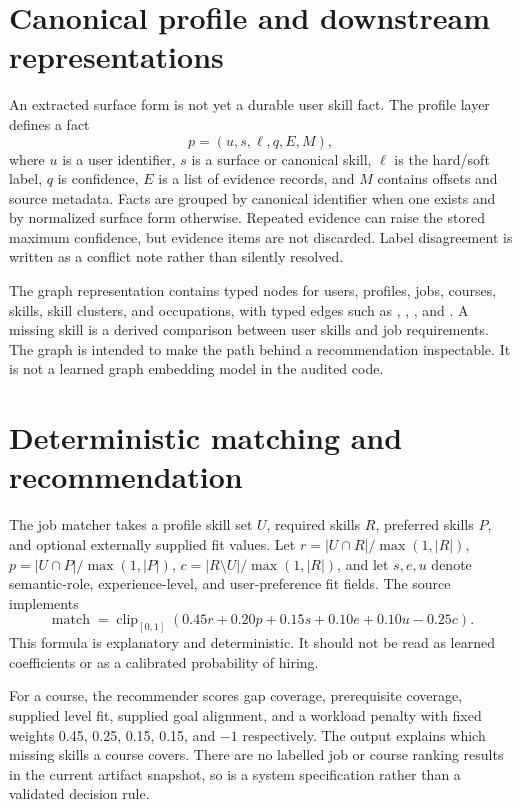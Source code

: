 \section{Canonical profile and downstream representations}

An extracted surface form is not yet a durable user skill fact. The profile layer defines a fact
\begin{equation}
 p=(u, s, \ell, q, E, M),
\end{equation}
where $u$ is a user identifier, $s$ is a surface or canonical skill, $\ell$ is the hard/soft label, $q$ is confidence, $E$ is a list of evidence records, and $M$ contains offsets and source metadata. Facts are grouped by canonical identifier when one exists and by normalized surface form otherwise. Repeated evidence can raise the stored maximum confidence, but evidence items are not discarded. Label disagreement is written as a conflict note rather than silently resolved.

The graph representation contains typed nodes for users, profiles, jobs, courses, skills, skill clusters, and occupations, with typed edges such as , , , and . A missing skill is a derived comparison between user skills and job requirements. The graph is intended to make the path behind a recommendation inspectable. It is not a learned graph embedding model in the audited code.

\section{Deterministic matching and recommendation}

The job matcher takes a profile skill set $U$, required skills $R$, preferred skills $P$, and optional externally supplied fit values. Let $r=|U\cap R|/\max(1,|R|)$, $p=|U\cap P|/\max(1,|P|)$, $c=|R\setminus U|/\max(1,|R|)$, and let $s,e,u$ denote semantic-role, experience-level, and user-preference fit fields. The source implements
\begin{equation}
 \operatorname{match}=\operatorname{clip}_{[0,1]}(0.45r+0.20p+0.15s+0.10e+0.10u-0.25c).
\label{eq:match}
\end{equation}
This formula is explanatory and deterministic. It should not be read as learned coefficients or as a calibrated probability of hiring.

For a course, the recommender scores gap coverage, prerequisite coverage, supplied level fit, supplied goal alignment, and a workload penalty with fixed weights 0.45, 0.25, 0.15, 0.15, and $-1$ respectively. The output explains which missing skills a course covers. There are no labelled job or course ranking results in the current artifact snapshot, so  is a system specification rather than a validated decision rule.
